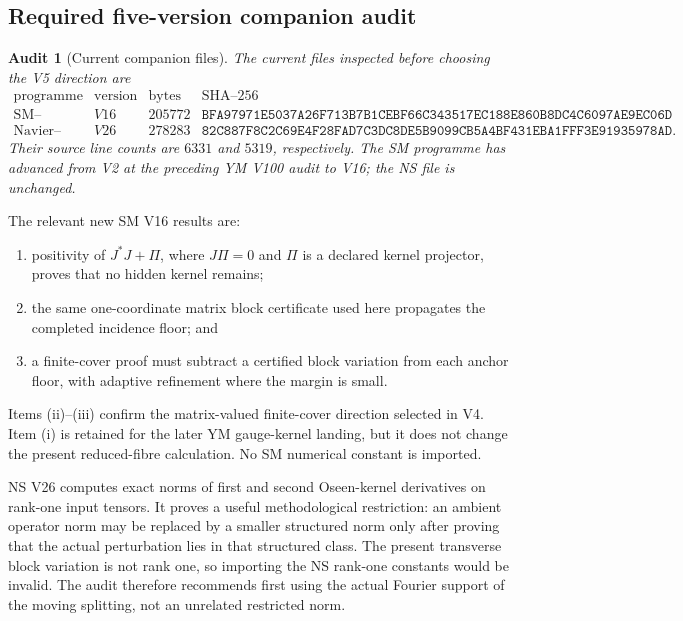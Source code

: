 \documentclass[11pt,oneside]{article}
\newtheorem{audit}[theorem]{Audit}
\theoremstyle{definition}
\theoremstyle{remark}
\begin{document}
\subsection{Required five-version companion audit}

\begin{audit}[Current companion files]
\label{aud:newv5-files}
The current files inspected before choosing the V5 direction are
\[
\begin{array}{c|r|r|l}
\text{programme}&\text{version}&\text{bytes}&\text{SHA--256}\\ \hline
\text{SM--Einstein}&V16&205772&
\texttt{BFA97971E5037A26F713B7B1CEBF66C343517EC188E860B8DC4C6097AE9EC06D}\\
\text{Navier--Stokes}&V26&278283&
\texttt{82C887F8C2C69E4F28FAD7C3DC8DE5B9099CB5A4BF431EBA1FFF3E91935978AD}.
\end{array}                                                \tag{5.1}
\]
Their source line counts are \(6331\) and \(5319\), respectively.
The SM programme has advanced from V2 at the preceding YM V100 audit
to V16; the NS file is unchanged.
\end{audit}

The relevant new SM V16 results are:
\begin{enumerate}[label=\textup{(\roman*)},leftmargin=3.3em]
\item positivity of \(J^*J+\Pi\), where \(J\Pi=0\) and \(\Pi\) is a
declared kernel projector, proves that no hidden kernel remains;
\item the same one-coordinate matrix block certificate used here
propagates the completed incidence floor; and
\item a finite-cover proof must subtract a certified block variation
from each anchor floor, with adaptive refinement where the margin is
small.
\end{enumerate}
Items (ii)--(iii) confirm the matrix-valued finite-cover direction
selected in V4.  Item (i) is retained for the later YM gauge-kernel
landing, but it does not change the present reduced-fibre calculation.
No SM numerical constant is imported.

NS V26 computes exact norms of first and second Oseen-kernel
derivatives on rank-one input tensors.  It proves a useful
methodological restriction: an ambient operator norm may be replaced
by a smaller structured norm only after proving that the actual
perturbation lies in that structured class.  The present transverse
block variation is not rank one, so importing the NS rank-one
constants would be invalid.  The audit therefore recommends first
using the actual Fourier support of the moving splitting, not an
unrelated restricted norm.
\end{document}
